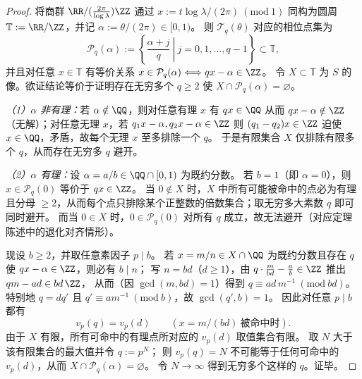 \begin{proof}
将商群 \(\RR/(\tfrac{2\pi}{\log\lambda})\ZZ\) 通过
\(
x:=t\log\lambda/(2\pi)\ (\mathrm{mod}\ 1)
\)
同构为圆周 \(\mathbb T:=\RR/\ZZ\)，并记 \(\alpha:=\theta/(2\pi)\in[0,1)\)。
则 \(\mathcal T_q(\theta)\) 对应的相位点集为
\[
\mathcal P_q(\alpha):=\left\{\left.\frac{\alpha+j}{q}\ \right|\ j=0,1,\dots,q-1\right\}\subset\mathbb T,
\]
并且对任意 \(x\in\mathbb T\) 有等价关系
\(
x\in\mathcal P_q(\alpha)\Longleftrightarrow qx-\alpha\in\ZZ
\)。
令 \(X\subset\mathbb T\) 为 \(S\) 的像。欲证结论等价于证明存在无穷多个 \(q\ge 2\) 使 \(X\cap\mathcal P_q(\alpha)=\varnothing\)。
\par
\emph{（1）\(\alpha\) 非有理：}若 \(\alpha\notin\QQ\)，则对任意有理 \(x\) 有 \(qx\in\QQ\) 从而 \(qx-\alpha\notin\ZZ\)（无解）；对任意无理 \(x\)，若 \(q_1x-\alpha,q_2x-\alpha\in\ZZ\) 则 \((q_1-q_2)x\in\ZZ\) 迫使 \(x\in\QQ\)，矛盾，故每个无理 \(x\) 至多排除一个 \(q\)。
于是有限集合 \(X\) 仅排除有限多个 \(q\)，从而存在无穷多 \(q\) 避开。
\par
\emph{（2）\(\alpha\) 有理：}设 \(\alpha=a/b\in\QQ\cap[0,1)\) 为既约分数。
若 \(b=1\)（即 \(\alpha=0\)），则 \(x\in\mathcal P_q(0)\) 等价于 \(qx\in\ZZ\)。
当 \(0\notin X\) 时，\(X\) 中所有可能被命中的点必为有理且分母 \(\ge 2\)，从而每个点只排除某个正整数的倍数集合；取无穷多大素数 \(q\) 即可同时避开。
而当 \(0\in X\) 时，\(0\in\mathcal P_q(0)\) 对所有 \(q\) 成立，故无法避开（对应定理陈述中的退化对齐情形）。
\par
现设 \(b\ge 2\)，并取任意素因子 \(p\mid b\)。
若 \(x=m/n\in X\cap\QQ\) 为既约分数且存在 \(q\) 使 \(qx-\alpha\in\ZZ\)，则必有 \(b\mid n\)；
写 \(n=bd\)（\(d\ge 1\)），由
\(
q\cdot \frac{m}{bd}-\frac{a}{b}\in\ZZ
\)
推出
\(
qm-ad\in bd\,\ZZ
\)，
从而（因 \(\gcd(m,bd)=1\)）得到 \(q\equiv ad\,m^{-1}\ (\mathrm{mod}\ bd)\)。
特别地 \(q=dq'\) 且 \(q'\equiv a m^{-1}\ (\mathrm{mod}\ b)\)，故 \(\gcd(q',b)=1\)。
因此对任意 \(p\mid b\) 都有
\[
v_p(q)=v_p(d)\qquad(x=m/(bd)\ \text{被命中时}).
\]
由于 \(X\) 有限，所有可命中的有理点所对应的 \(v_p(d)\) 取值集合有限。
取 \(N\) 大于该有限集合的最大值并令 \(q:=p^{N}\)；
则 \(v_p(q)=N\) 不可能等于任何可命中的 \(v_p(d)\)，从而 \(X\cap\mathcal P_q(\alpha)=\varnothing\)。
令 \(N\to\infty\) 得到无穷多个这样的 \(q\)。证毕。
\end{proof}

